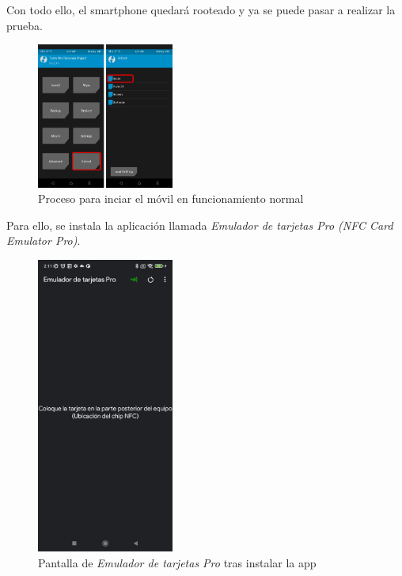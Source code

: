 \documentclass[12pt,a4paper,onecolumn,oneside]{report}
\begin{document}
Con todo ello, el smartphone quedará rooteado y ya se puede pasar a realizar la prueba.

\begin{figure}[H] 
\centering
  \includegraphics[width=0.4\textwidth]{figuras/root55.png}
  \caption[Proceso para inciar el móvil en funcionamiento normal]{Proceso para inciar el móvil en funcionamiento normal\\
  }
  \label{fig:root55}
\end{figure}

Para ello, se instala la aplicación llamada \textit{Emulador de tarjetas Pro (NFC Card Emulator Pro)}. 


\begin{figure}[H] 
\centering
  \includegraphics[width=0.4\textwidth]{figuras/root6.png}
  \caption[Pantalla de \textit{Emulador de tarjetas Pro} tras instalar la app]{Pantalla de \textit{Emulador de tarjetas Pro} tras instalar la app\\
  }
  \label{fig:root6}
\end{figure}
\end{document}
